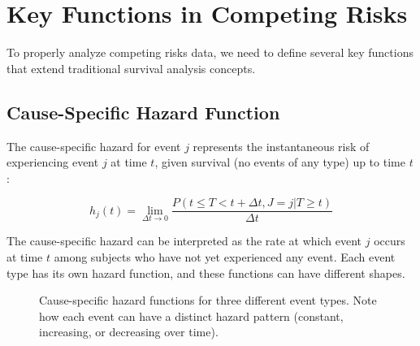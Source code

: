 \section{Key Functions in Competing Risks}

To properly analyze competing risks data, we need to define several key functions that extend traditional survival analysis concepts.

\subsection{Cause-Specific Hazard Function}

\begin{definitionbox}[title=Cause-Specific Hazard]
The cause-specific hazard for event $j$ represents the instantaneous risk of experiencing event $j$ at time $t$, given survival (no events of any type) up to time $t$:

\begin{equation}
h_j(t) = \lim_{\Delta t \to 0} \frac{P(t \leq T < t + \Delta t, J = j | T \geq t)}{\Delta t}
\end{equation}
\end{definitionbox}

The cause-specific hazard can be interpreted as the rate at which event $j$ occurs at time $t$ among subjects who have not yet experienced any event. Each event type has its own hazard function, and these functions can have different shapes.

\begin{figure}[htbp]
    \centering
    \caption{Cause-specific hazard functions for three different event types. Note how each event can have a distinct hazard pattern (constant, increasing, or decreasing over time).}
    \label{fig:cause-specific-hazards}
\end{figure}

